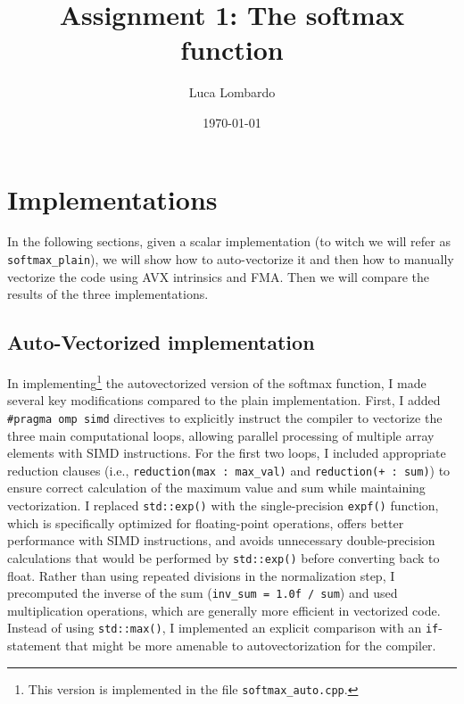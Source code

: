 \documentclass[11pt]{article}
\title{Assignment 1: The softmax function}
\author{Luca Lombardo}
\date{\today}
\newcommand{\R}{\mathbb{R}}
\begin{document}
\maketitle

\tableofcontents

\setlength{\parindent}{0em}



\section{Implementations}
In the following sections, given a scalar implementation (to witch we will refer as \texttt{softmax\_plain}), we will show how to auto-vectorize it and then how to manually vectorize the code using AVX intrinsics and FMA. Then we will compare the results of the three implementations.

\subsection{Auto-Vectorized implementation}
In implementing\footnote{This version is implemented in the file \texttt{softmax\_auto.cpp}.} the autovectorized version of the softmax function, I made several key modifications compared to the plain implementation. First, I added \texttt{\#pragma omp simd} directives to explicitly instruct the compiler to vectorize the three main computational loops, allowing parallel processing of multiple array elements with SIMD instructions. For the first two loops, I included appropriate reduction clauses (i.e., \texttt{reduction(max : max\_val)} and \texttt{reduction(+ : sum)}) to ensure correct calculation of the maximum value and sum while maintaining vectorization. I replaced \texttt{std::exp()} with the single-precision \texttt{expf()} function, which is specifically optimized for floating-point operations, offers better performance with SIMD instructions, and avoids unnecessary double-precision calculations that would be performed by \texttt{std::exp()} before converting back to float. Rather than using repeated divisions in the normalization step, I precomputed the inverse of the sum (\texttt{inv\_sum = 1.0f / sum}) and used multiplication operations, which are generally more efficient in vectorized code. Instead of using \texttt{std::max()}, I implemented an explicit comparison with an \texttt{if}-statement that might be more amenable to autovectorization for the compiler.
\end{document}
